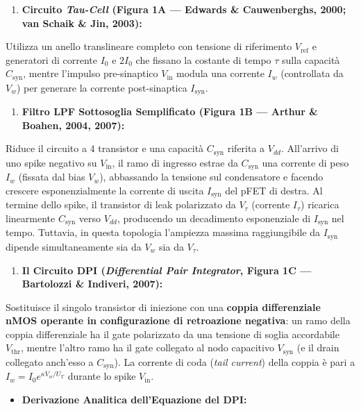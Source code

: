\documentclass[11pt,a4paper]{article}
\begin{document}
\begin{enumerate}
  \item \textbf{Circuito \textit{Tau-Cell} (Figura 1A --- Edwards \& Cauwenberghs, 2000; van Schaik \& Jin, 2003):}
\end{enumerate}
Utilizza un anello translineare completo con tensione di riferimento $V_{\text{ref}}$ e generatori di corrente $I_0$ e $2I_0$ che fissano la costante di tempo $\tau$ sulla capacità $C_{\text{syn}}$, mentre l'impulso pre-sinaptico $V_{\text{in}}$ modula una corrente $I_w$ (controllata da $V_w$) per generare la corrente post-sinaptica $I_{\text{syn}}$.
\begin{enumerate}
  \item \textbf{Filtro LPF Sottosoglia Semplificato (Figura 1B --- Arthur \& Boahen, 2004, 2007):}
\end{enumerate}
Riduce il circuito a 4 transistor e una capacità $C_{\text{syn}}$ riferita a $V_{dd}$. All'arrivo di uno spike negativo su $V_{\text{in}}$, il ramo di ingresso estrae da $C_{\text{syn}}$ una corrente di peso $I_w$ (fissata dal bias $V_w$), abbassando la tensione sul condensatore e facendo crescere esponenzialmente la corrente di uscita $I_{\text{syn}}$ del pFET di destra. Al termine dello spike, il transistor di leak polarizzato da $V_\tau$ (corrente $I_\tau$) ricarica linearmente $C_{\text{syn}}$ verso $V_{dd}$, producendo un decadimento esponenziale di $I_{\text{syn}}$ nel tempo. Tuttavia, in questa topologia l'ampiezza massima raggiungibile da $I_{\text{syn}}$ dipende simultaneamente sia da $V_w$ sia da $V_\tau$.
\begin{enumerate}
  \item \textbf{Il Circuito DPI (\textit{Differential Pair Integrator}, Figura 1C --- Bartolozzi \& Indiveri, 2007):}
\end{enumerate}
Sostituisce il singolo transistor di iniezione con una \textbf{coppia differenziale nMOS operante in configurazione di retroazione negativa}: un ramo della coppia differenziale ha il gate polarizzato da una tensione di soglia accordabile \textbf{$V_{\text{thr}}$}, mentre l'altro ramo ha il gate collegato al nodo capacitivo $V_{\text{syn}}$ (e il drain collegato anch'esso a $C_{\text{syn}}$). La corrente di coda (\textit{tail current}) della coppia è pari a $I_w = I_0 e^{\kappa V_w / U_T}$ durante lo spike $V_{\text{in}}$.
\begin{itemize}
  \item \textbf{Derivazione Analitica dell'Equazione del DPI:}
\end{itemize}
\end{document}
